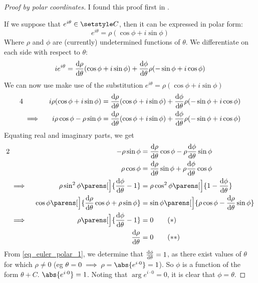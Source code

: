 \begin{proof}[Proof by polar coordinates]
 I found this proof first in \cite{WikiEulersFormula}.

 If we suppose that \(e^{i \theta} \in \Complex\), then it can be expressed in
 polar form:
 \begin{equation*}
  e^{i \theta} = \rho (\cos \phi + i \sin \phi)
 \end{equation*}
 Where \(\rho\) and \(\phi\) are (currently) undetermined functions of
 \(\theta\). We differentiate on each side with respect to \(\theta\):
 \begin{equation*}
  i e^{i \theta} = \dv<\rho>{\theta} (\cos \phi + i \sin \phi)
                 + \dv<\phi>{\theta} \rho (-\sin \phi + i \cos \phi)
 \end{equation*}
 We can now use make use of the substitution
 \(e^{i \theta} = \rho (\cos \phi + i \sin \phi)\)
 \begin{alignat*}4
  && i \rho (\cos \phi + i \sin \phi) &=
                   \dv<\rho>{\theta} (\cos \phi + i \sin \phi)
                 + \dv<\phi>{\theta} \rho (-\sin \phi + i \cos \phi) \\
  &\implies{}& i \rho \cos \phi - \rho \sin \phi &=
                   \dv<\rho>{\theta} (\cos \phi + i \sin \phi)
                 + \dv<\phi>{\theta} \rho (-\sin \phi + i \cos \phi)
 \end{alignat*}
 Equating real and imaginary parts, we get
 \begin{alignat*}2
  && -\rho \sin \phi &= \dv<\rho>{\theta} \cos \phi
                      - \rho \dv<\phi>{\theta} \sin \phi \\
  && \rho \cos \phi &= \dv<\rho>{\theta} \sin \phi
                     + \rho \dv<\phi>{\theta} \cos \phi \\
  &\implies{}& \rho \sin^2 \phi \parens[\Big]{\dv<\phi>{\theta} - 1} &=
               \rho \cos^2 \phi \parens[\Big]{1 - \dv<\phi>{\theta}} \\
  && \cos \phi \parens[\Big]{\dv<\rho>{\theta} \cos \phi + \rho \sin \phi} &=
     \sin \phi \parens[\Big]{\rho \cos \phi - \dv<\rho>{\theta} \sin \phi} \\
  &\implies{}& \rho \parens[\Big]{\dv<\phi>{\theta} - 1} &= 0
   \tag{\(\ast\)} \label{eq_euler_polar_1} \\
  && \dv<\rho>{\theta} &= 0
   \tag{\(\ast\ast\)} \label{eq_euler_polar_2}
 \end{alignat*}
 From \ref{eq_euler_polar_1}, we determine that \(\dv<\phi>{\theta} = 1\), as
 there exist values of \(\theta\) for which \(\rho \ne 0\)
 (eg \(\theta = 0 \implies \rho = \abs{e^{i \cdot 0}} = 1\)). So \(\phi\) is a
 function of the form \(\theta + C\).
 \(\abs{e^{i \cdot 0}} = 1\). Noting that \(\arg e^{i \cdot 0} = 0\), it is
 clear that \(\phi = \theta\).


\end{proof}
